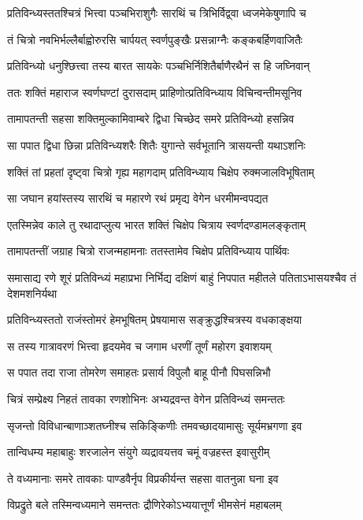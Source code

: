 \twolineshloka
{प्रतिविन्ध्यस्ततश्चित्रं भित्त्वा पञ्चभिराशुगैः}
{सारथिं च त्रिभिर्विद्व्वा ध्वजमेकेषुणापि च}


\twolineshloka
{तं चित्रो नवभिर्भल्लैर्बाह्वोरुरसि चार्पयत्}
{स्वर्णपुङ्खैः प्रसन्नाग्नैः कङ्कबर्हिणवाजितैः}


\twolineshloka
{प्रतिविन्ध्यो धनुश्छित्त्वा तस्य बारत सायकेः}
{पञ्चभिर्निशितैर्बाणैरथैनं स हि जघ्निवान्}


\twolineshloka
{ततः शक्तिं महाराज स्वर्णघण्टां दुरासदाम्}
{प्राहिणोत्प्रतिविन्ध्याय विचिन्वन्तीमसूनिव}


\twolineshloka
{तामापतन्ती सहसा शक्तिमुल्कामिवाम्बरे}
{द्विधा चिच्छेद समरे प्रतिविन्ध्यो हसन्निव}


\twolineshloka
{सा पपात द्विधा छिन्ना प्रतिविन्ध्यशरैः शितैः}
{युगान्ते सर्वभूतानि त्रासयन्ती यथाऽशनिः}


\twolineshloka
{शक्तिं तां प्रहतां दृष्ट्वा चित्रो गृह्य महागदाम्}
{प्रतिविन्ध्याय चिक्षेप रुक्मजालविभूषिताम्}


\twolineshloka
{सा जघान हयांस्तस्य सारथिं च महारणे}
{रथं प्रमृद्य वेगेन धरमीमन्वपद्यत}


\twolineshloka
{एतस्मिन्नेव काले तु रथादाप्लुत्य भारत}
{शक्तिं चिक्षेप चित्राय स्वर्णदण्डामलङ्कृताम्}


\twolineshloka
{तामापतन्तीं जग्राह चित्रो राजन्महामनाः}
{ततस्तामेव चिक्षेप प्रतिविन्ध्याय पार्थिवः}


\threelineshloka
{समासाद्य रणे शूरं प्रतिविन्ध्यं महाप्रभा}
{निर्भिद्य दक्षिणं बाहुं निपपात महीतले}
{पतिताऽभासयश्चैव तं देशमशनिर्यथा}


\twolineshloka
{प्रतिविन्ध्यस्ततो राजंस्तोमरं हेमभूषितम्}
{प्रेषयामास सङ्क्रुद्धश्चित्रस्य वधकाङ्क्षया}


\twolineshloka
{स तस्य गात्रावरणं भित्त्वा हृदयमेव च}
{जगाम धरणीं तूर्णं महोरग इवाशयम्}


\twolineshloka
{स पपात तदा राजा तोमरेण समाहतः}
{प्रसार्य विपुलौ बाहू पीनौ पिघसन्निभौ}


\twolineshloka
{चित्रं सम्प्रेक्ष्य निहतं तावका रणशोभिनः}
{अभ्यद्रवन्त वेगेन प्रतिविन्ध्यं समन्ततः}


\twolineshloka
{सृजन्तो विविधान्बाणाञ्शतघ्नीश्च सकिङ्किणीः}
{तमवच्छादयामासुः सूर्यमभ्रगणा इव}


\twolineshloka
{तान्विधम्य महाबाहुः शरजालेन संयुगे}
{व्यद्रावयत्तव चमूं वज्रहस्त इवासुरीम्}


\twolineshloka
{ते वध्यमानाः समरे तावकाः पाण्डवैर्नृप}
{विप्रकीर्यन्त सहसा वातनुन्ना घना इव}


\twolineshloka
{विप्रद्रुते बले तस्मिन्वध्यमाने समन्ततः}
{द्रौणिरेकोऽभ्ययात्तूर्णं भीमसेनं महाबलम्}


